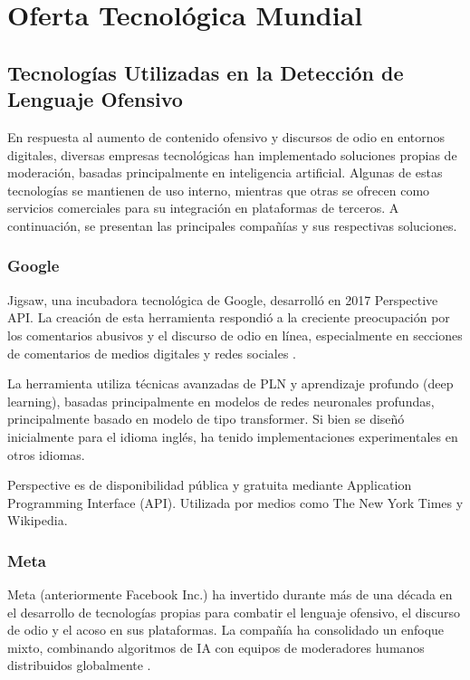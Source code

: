 \chapter{Oferta Tecnológica Mundial}

\section{Tecnologías Utilizadas en la Detección de Lenguaje Ofensivo}

En respuesta al aumento de contenido ofensivo y discursos de odio en entornos digitales, diversas empresas tecnológicas han implementado soluciones propias de moderación, basadas principalmente en inteligencia artificial. Algunas de estas tecnologías se mantienen de uso interno, mientras que otras se ofrecen como servicios comerciales para su integración en plataformas de terceros. A continuación, se presentan las principales compañías y sus respectivas soluciones.

\subsection{Google}

Jigsaw, una incubadora tecnológica de Google, desarrolló en 2017 Perspective API. La creación de esta herramienta respondió a la creciente preocupación por los comentarios abusivos y el discurso de odio en línea, especialmente en secciones de comentarios de medios digitales y redes sociales \cite{perspective2025research}.

La herramienta utiliza técnicas avanzadas de PLN y aprendizaje profundo (deep learning), basadas principalmente en modelos de redes neuronales profundas, principalmente basado en modelo de tipo transformer. Si bien se diseñó inicialmente para el idioma inglés, ha tenido implementaciones experimentales en otros idiomas.

Perspective es de disponibilidad pública y gratuita mediante Application Programming Interface (API). Utilizada por medios como The New York Times y Wikipedia.

\subsection{Meta}

Meta (anteriormente Facebook Inc.) ha invertido durante más de una década en el desarrollo de tecnologías propias para combatir el lenguaje ofensivo, el discurso de odio y el acoso en sus plataformas. La compañía ha consolidado un enfoque mixto, combinando algoritmos de IA con equipos de moderadores humanos distribuidos globalmente \cite{meta2025transparency}.

